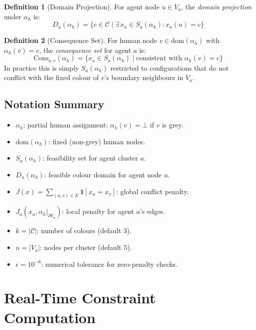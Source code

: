 \documentclass[10pt]{article}
\theoremstyle{definition}
\newtheorem{definition}{Definition}[section]
\begin{document}
\begin{definition}[Domain Projection]
For agent node $u \in V_a$, the \emph{domain projection} under $\alpha_h$ is:
\[
  D_u(\alpha_h) = \bigl\{ c \in \mathcal{C} \;\big|\;
    \exists\, x_a \in S_a(\alpha_h): x_a(u) = c \bigr\}
\]
\end{definition}

\begin{definition}[Consequence Set]
For human node $v \in \mathrm{dom}(\alpha_h)$ with $\alpha_h(v) = c$, the \emph{consequence set}
for agent $a$ is:
\[
  \mathrm{Cons}_{a,v}(\alpha_h) =
    \bigl\{ x_a \in S_a(\alpha_h) \;\big|\; \text{consistent with } \alpha_h(v) = c \bigr\}
\]
In practice this is simply $S_a(\alpha_h)$ restricted to configurations that do not conflict with
the fixed colour of $v$'s boundary neighbours in $V_a$.
\end{definition}

\subsection{Notation Summary}

\begin{itemize}[leftmargin=*]
  \item $\alpha_h$: partial human assignment; $\alpha_h(v) = \bot$ if $v$ is grey.
  \item $\mathrm{dom}(\alpha_h)$: fixed (non-grey) human nodes.
  \item $S_a(\alpha_h)$: feasibility set for agent cluster $a$.
  \item $D_u(\alpha_h)$: feasible colour domain for agent node $u$.
  \item $J(x) = \sum_{(u,v)\in E} \mathbf{1}[x_u=x_v]$: global conflict penalty.
  \item $J_a(x_a, \alpha_h|_{\partial V_a})$: local penalty for agent $a$'s edges.
  \item $k = |\mathcal{C}|$: number of colours (default 3).
  \item $n = |V_a|$: nodes per cluster (default 5).
  \item $\epsilon = 10^{-6}$: numerical tolerance for zero-penalty checks.
\end{itemize}

\section{Real-Time Constraint Computation}
\label{app:computation}
\end{document}
